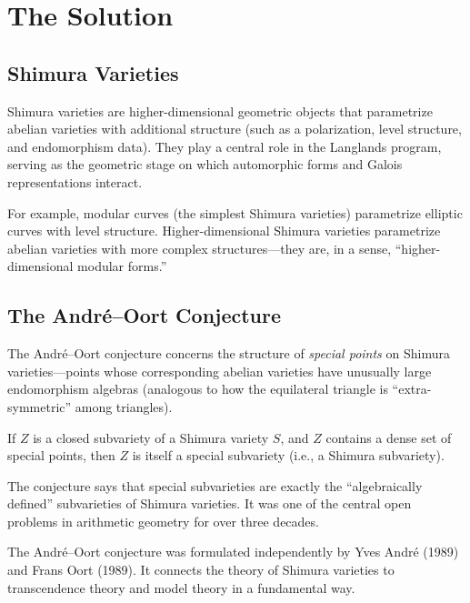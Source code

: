 \section{The Solution}

\subsection{Shimura Varieties}

Shimura varieties are higher-dimensional geometric objects that parametrize abelian varieties with additional structure (such as a polarization, level structure, and endomorphism data). They play a central role in the Langlands program, serving as the geometric stage on which automorphic forms and Galois representations interact.

For example, modular curves (the simplest Shimura varieties) parametrize elliptic curves with level structure. Higher-dimensional Shimura varieties parametrize abelian varieties with more complex structures---they are, in a sense, ``higher-dimensional modular forms.''

\subsection{The André--Oort Conjecture}

The André--Oort conjecture concerns the structure of \emph{special points} on Shimura varieties---points whose corresponding abelian varieties have unusually large endomorphism algebras (analogous to how the equilateral triangle is ``extra-symmetric'' among triangles).

\begin{conjecture}
If $Z$ is a closed subvariety of a Shimura variety $S$, and $Z$ contains a dense set of special points, then $Z$ is itself a special subvariety (i.e., a Shimura subvariety).
\end{conjecture}

The conjecture says that special subvarieties are exactly the ``algebraically defined'' subvarieties of Shimura varieties. It was one of the central open problems in arithmetic geometry for over three decades.

\begin{historicalbox}
The André--Oort conjecture was formulated independently by Yves André (1989) and Frans Oort (1989). It connects the theory of Shimura varieties to transcendence theory and model theory in a fundamental way.
\end{historicalbox}

